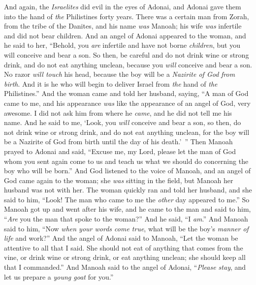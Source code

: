 \begin{biblechapter} %
 And again, the \textit{Israelites} did evil in the eyes of Adonai, and Adonai gave them into the hand of \textit{the} Philistines forty years.
\verse There was a certain man from Zorah, from the tribe of the Danites, and his name \textit{was} Manoah; his wife \textit{was} infertile and did not bear children.
\verse And an angel of Adonai appeared to the woman, and he said to her, “Behold, you \textit{are} infertile and have not borne \textit{children}, but you will conceive and bear a son.
\verse So then, be careful and do not drink wine or strong drink, and do not eat anything unclean,
\verse because you \textit{will} conceive and bear a son. No razor \textit{will touch} his head, because the boy will be a \textit{Nazirite of God} \textit{from birth}. And it is he who will begin to deliver Israel from \textit{the} hand of \textit{the} Philistines.”
\verse And the woman came and told her husband, saying, “A man of God came to me, and his appearance \textit{was} like the appearance of an angel of God, very awesome. I did not ask him from where he \textit{came}, and he did not tell me his name.
\verse And he said to me, ‘Look, you \textit{will} conceive and bear a son, so then, do not drink wine or strong drink, and do not eat anything unclean, for the boy will be a Nazirite of God from birth until the day of his death.’ ”
\verse Then Manoah prayed to Adonai and said, “Excuse me, my Lord, please let the man of God whom you sent again come to us and teach us what we should do concerning the boy who will be born.”
\verse And God listened to the voice of Manoah, and an angel of God came again to the woman; she \textit{was} sitting in the field, but Manoah her husband was not with her.
\verse The woman quickly ran and told her husband, and she said to him, “Look! The man who came to me the \textit{other} day appeared to me.”
\verse So Manoah got up and went after his wife, and he came to the man and said to him, “\textit{Are} you the man that spoke to the woman?” And he said, “I \textit{am}.”
\verse And Manoah said to him, “Now \textit{when your words come true}, what will be the boy’s \textit{manner of life} and work?”
\verse And the angel of Adonai said to Manoah, “Let the woman be attentive to all that I said.
\verse She should not eat of anything that comes from the vine, or drink wine or strong drink, or eat anything unclean; she should keep all that I commanded.”
\verse And Manoah said to the angel of Adonai, “\textit{Please stay}, and let us prepare a \textit{young goat} for you.”

\end{biblechapter}
